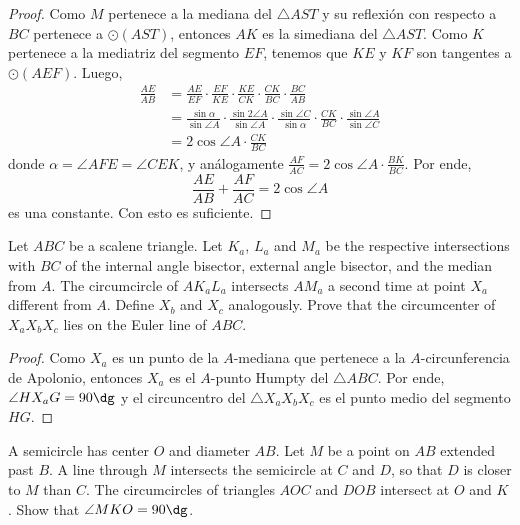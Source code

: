 \begin{proof}
  Como $M$ pertenece a la mediana del $\triangle AST$ y su reflexión con
  respecto a $BC$ pertenece a $\odot(AST)$, entonces $AK$ es la simediana del
  $\triangle AST$. Como $K$ pertenece a la mediatriz del segmento $EF$, tenemos
  que $KE$ y $KF$ son tangentes a $\odot(AEF)$. Luego,
  \begin{align*}
    \frac{AE}{AB}
    &= \frac{AE}{EF}\cdot\frac{EF}{KE}\cdot\frac{KE}{CK}\cdot\frac{CK}{BC}\cdot\frac{BC}{AB} \\
    &= \frac{\sin{\alpha}}{\sin{\angle A}}\cdot\frac{\sin{2\angle A}}{\sin{\angle A}}\cdot\frac{\sin{\angle C}}{\sin{\alpha}}\cdot\frac{CK}{BC}\cdot\frac{\sin{\angle A}}{\sin{\angle C}} \\
    &= 2\cos{\angle A}\cdot\frac{CK}{BC}
  \end{align*}
  donde $\alpha=\angle AFE=\angle CEK$, y análogamente
  $\frac{AF}{AC}=2\cos{\angle A}\cdot\frac{BK}{BC}$. Por ende,
  \[\frac{AE}{AB}+\frac{AF}{AC}=2\cos{\angle A}\]
  es una constante. Con esto es suficiente.
\end{proof}

\begin{probEG}
  Let $ABC$ be a scalene triangle. Let $K_a$, $L_a$ and $M_a$ be the respective
  intersections with $BC$ of the internal angle bisector, external angle
  bisector, and the median from $A$. The circumcircle of $AK_aL_a$ intersects
  $AM_a$ a second time at point $X_a$ different from $A$. Define $X_b$ and $X_c$
  analogously. Prove that the circumcenter of $X_aX_bX_c$ lies on the Euler line
  of $ABC$.
\end{probEG}

\begin{proof}
  Como $X_a$ es un punto de la $A$-mediana que pertenece a la $A$-circunferencia
  de Apolonio, entonces $X_a$ es el $A$-punto Humpty del $\triangle ABC$. Por
  ende, $\angle HX_aG=90\dg$ y el circuncentro del $\triangle X_aX_bX_c$ es el
  punto medio del segmento $HG$.
\end{proof}

\begin{probEG}
  A semicircle has center $O$ and diameter $AB$. Let $M$ be a point on $AB$
  extended past $B$. A line through $M$ intersects the semicircle at $C$ and
  $D$, so that $D$ is closer to $M$ than $C$. The circumcircles of triangles
  $AOC$ and $DOB$ intersect at $O$ and $K$. Show that $\angle MKO=90\dg$.
\end{probEG}

